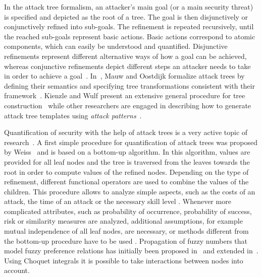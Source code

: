 \documentclass[a4paper]{article}
\begin{document}
In the attack tree formalism, an attacker's main goal (or a main security
threat) is specified and depicted as the root of a tree. The goal is then
disjunctively or conjunctively refined into sub-goals. The refinement is 
repeated recursively, until the reached sub-goals represent basic  actions.
Basic actions correspond to atomic components, which can  easily be understood
and quantified. Disjunctive refinements represent  different alternative ways of
how a goal can be achieved, whereas conjunctive refinements depict different
steps an attacker needs to take in order to achieve a goal~\cite{QiLe}.
In~, Mauw and Oostdijk formalize attack trees  by defining their semantics
and specifying tree transformations consistent with  their
framework~\cite{MaOo}. Kienzle and Wulf present an extensive general procedure
for tree construction~\cite{KiWu} while other researchers are engaged  in
describing how to generate attack tree templates using \emph{attack 
patterns}~\cite{MoElLi,LiMo}.

Quantification of security with the help of attack trees is a very active
topic of research~\cite{WhPhWaPa}. A first simple procedure for quantification
of attack trees was proposed by Weiss~\cite{Weis} and is based on a bottom-up
algorithm. In this algorithm, values are provided for all leaf nodes and the
tree is traversed from the leaves towards the root
in order to compute values of the refined nodes.  
Depending on the type of
refinement, different functional operators are used to combine the values of
the children. This procedure allows to analyze simple aspects, such as the 
costs of an attack, the time of an attack or the necessary skill level
\cite{Weis,Amor,SaSaScWa,Schn,ByFrMi,HiUnJaSaLu,FuChWaLeTaAnLi,MaOo,BiDaPe,Yage,EdDaRaMi,SaDuPa,HeApFuRoRuWe,LiLiFeHe,AbCeKa,BaPe,TaJo,WhPhWaPa}.
Whenever more complicated attributes, such as probability of occurrence, 
probability of success, risk or similarity measures are analyzed, additional 
assumptions, for example mutual independence of all leaf nodes, are
necessary, or methods different from the bottom-up 
procedure have to be used
\cite{Schn,ByFrMi,BuLaPrSaWi,EdDaRaMi,Yage,JuWi3,HeApFuRoRuWe,LiLiFeHe,Buon2,AbCeKa,BuFeMe,OnTuThNaSzMa,BuFeMe2,MaThFe,WaWhPhPa,ReSeKoStHo,RoKiTr2,ZhYu}.
Propagation of fuzzy numbers that model fuzzy preference relations has 
initially been proposed in~\cite{BoFeGi} and extended in~\cite{BuFe}. Using 
Choquet integrals it is possible to take interactions between nodes into 
account.
\end{document}

